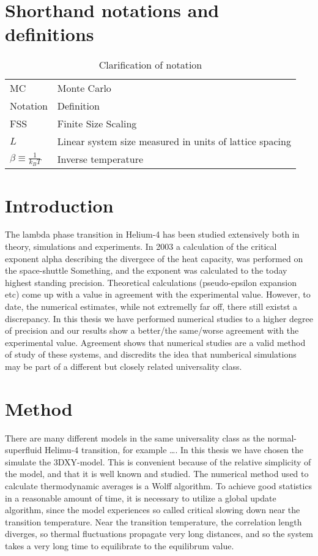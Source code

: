 \documentclass[a4paper]{article}
\begin{document}
\section{Shorthand notations and definitions}
\begin{table}[htpb]
  \begin{center}
    \begin{tabular}{l l}
      MC & Monte Carlo\\
      Notation & Definition\\
      FSS & Finite Size Scaling\\
      $L$ & Linear system size measured in units of lattice spacing\\
      $\beta \equiv \frac{1}{k_B T}$ & Inverse temperature\\
    \end{tabular}
  \end{center}
  \caption{Clarification of notation}
\end{table}
\section{Introduction}
The lambda phase transition in Helium-4 has been studied extensively both in theory, simulations and experiments. In 2003 a calculation of the critical exponent alpha describing the divergece of the heat capacity, was performed on the space-shuttle Something, and the exponent was calculated to the today highest standing precision. Theoretical calculations (pseudo-epsilon expansion etc) come up with a value in agreement with the experimental value. However, to date, the numerical estimates, while not extremelly far off, there still existst a discrepancy. In this thesis we have performed numerical studies to a higher degree of precision and our results show a better/the same/worse agreement with the experimental value. Agreement shows that numerical studies are a valid method of study of these systems, and discredits the idea that numberical simulations may be part of a different but closely related universality class.
\section{Method}
There are many different models in the same universality class as the normal-superfluid Helimu-4 transition, for example \dots.
In this thesis we have chosen the simulate the 3DXY-model. This is convenient because of the relative simplicity of the model, and that it is well known and studied.
The numerical method used to calculate thermodynamic averages is a Wolff algorithm.
To achieve good statistics in a reasonable amount of time, it is necessary to utilize a global update algorithm, since the model experiences so called critical slowing down near the transition temperature. 
Near the transition temperature, the correlation length diverges, so thermal fluctuations propagate very long distances, and so the system takes a very long time to equilibrate to the equilibrum value.
\end{document}
